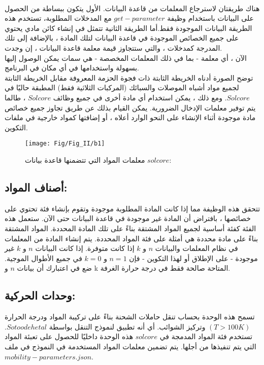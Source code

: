 \\هناك طريقتان لاسترجاع المعلمات من قاعدة البيانات. الأول يتكون ببساطة من الحصول على البيانات باستخدام وظيفة $ get-parameter $ مع المدخلات المطلوبة، تستخدم هذه الطريقة البيانات الموجودة فقط.أما الطريقة الثانية تتمثل في إنشاء كائن مادي يحتوي على جميع الخصائص الموجودة في قاعدة البيانات لتلك المادة ، بالإضافة إلى تلك المدرجة كمدخلات ، والتي ستتجاوز قيمة معلمة قاعدة البيانات ، إن وجدت.
\\
الآن ، أي معلمة - بما في ذلك المعلمات المخصصة - هي سمات يمكن الوصول إليها بسهولة واستخدامها في أي مكان في البرنامج.
\\
توضح الصورة أدناه الخريطة الثابتة ذات فجوة الحزمة المعروفة مقابل الخريطة الثابتة لجميع مواد أشباه الموصلات والسبائك (المركبات الثلاثية فقط) المطبقة حاليًا في $ Solcore $. ومع ذلك ، يمكن استخدام أي مادة أخرى في جميع وظائف $ Solcore $ ، طالما يتم توفير معلمات الإدخال الضرورية. يمكن القيام بذلك عن طريق تجاوز جميع خصائص مادة موجودة أثناء الإنشاء على النحو الوارد أعلاه ، أو إضافتها كمواد خارجية في ملفات التكوين.
\begin{figure}[h!]
	\centering
	\texttt{[image: Fig/Fig\_II/b1]}
	\caption{معلمات المواد التي تتضمنها قاعدة بيانات $ solcore $:}
	\label{fig:b1}
\end{figure}
\FloatBarrier

\subsection{أصناف المواد:}
تتحقق هذه الوظيفة مما إذا كانت المادة المطلوبة موجودة وتقوم بإنشاء فئة تحتوي على خصائصها ، بافتراض أن المادة غير موجودة في قاعدة البيانات حتى الآن.
ستعمل هذه الفئة كفئة أساسية لجميع المواد المشتقة بناءً على تلك المادة المحددة.
المواد المشتقة بناءً على مادة محددة هي أمثلة على فئة المواد المحددة.
يتم إنشاء المادة من المعلمات في نظام المعلمات والبيانات $ n $ و $ k $ إذا كانت متوفرة. إذا كانت البيانات $ n $ و $ k $ غير موجودة - على الإطلاق أو لهذا التكوين - فإن $ n = 1 $ و $ k = 0 $ في جميع الأطوال الموجية. ضع في اعتبارك أن بيانات $ n $ و k المتاحة صالحة فقط في درجة حرارة الغرفة.
\subsection{وحدات الحركية:}

تسمح هذه الوحدة بحساب تنقل حاملات الشحنة بناءً على تركيبة المواد ودرجة الحرارة$  (T> 100K) $ وتركيز الشوائب. أي أنه تطبيق لنموذج التنقل بواسطة $ Sotoodeh et al $. تستخدم فئة المواد المدمجة في $ solcore $ هذه الوحدة داخليًا للحصول على تعبئة المواد التي يتم تنفيذها من أجلها.
يتم تضمين معلمات المواد المستخدمة في النموذج في ملف $ mobility-parameters.json $.

